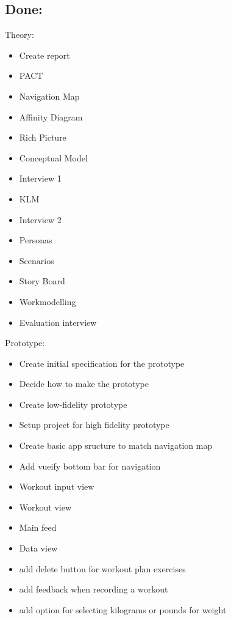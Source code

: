 \documentclass{article}
\begin{document}
\subsection*{Done:}
Theory:
\begin{itemize}
\item Create report
\item PACT 
\item Navigation Map
\item Affinity Diagram
\item Rich Picture
\item Conceptual Model
\item Interview 1
\item KLM
\item Interview 2
\item Personas
\item Scenarios
\item Story Board
\item Workmodelling
\item Evaluation interview
\end{itemize}
Prototype:
\begin{itemize}
\item Create initial specification for the prototype
\item Decide how to make the prototype
\item Create low-fidelity prototype
\item Setup project for high fidelity prototype
\item Create basic app sructure to match navigation map
\item Add vueify bottom bar for navigation
\item Workout input view
\item Workout view
\item Main feed
\item Data view
\item add delete button for workout plan exercises
\item add feedback when recording a workout
\item add option for selecting kilograms or pounds for weight
\end{itemize}
\end{document}
